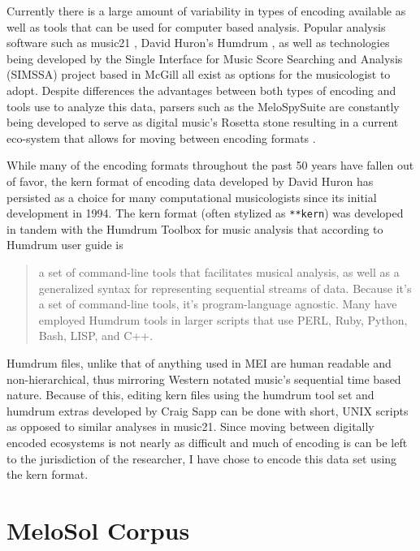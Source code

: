 \documentclass[]{book}
\begin{document}
Currently there is a large amount of variability in types of encoding available as well as tools that can be used for computer based analysis.
Popular analysis software such as music21 \citep{cuthbertMusic21ToolkitComputerAided2010}, David Huron's Humdrum \citep{huronHumdrumToolkitReference1994}, as well as technologies being developed by the Single Interface for Music Score Searching and Analysis (SIMSSA) project based in McGill all exist as options for the musicologist to adopt.
Despite differences the advantages between both types of encoding and tools use to analyze this data, parsers such as the MeloSpySuite are constantly being developed to serve as digital music's Rosetta stone resulting in a current eco-system that allows for moving between encoding formats \citep{frielerIntroducingJazzomatProject2013}.

While many of the encoding formats throughout the past 50 years have fallen out of favor, the kern format of encoding data developed by David Huron has persisted as a choice for many computational musicologists since its initial development in 1994.
The kern format (often stylized as \texttt{**kern}) was developed in tandem with the Humdrum Toolbox for music analysis that according to Humdrum user guide \citep{huronHumdrumToolkitReference1994} is

\begin{quote}
a set of command-line tools that facilitates musical analysis, as well as a generalized syntax for representing sequential streams of data. Because it's a set of command-line tools, it's program-language agnostic. Many have employed Humdrum tools in larger scripts that use PERL, Ruby, Python, Bash, LISP, and C++.
\end{quote}

Humdrum files, unlike that of anything used in MEI are human readable and non-hierarchical, thus mirroring Western notated music's sequential time based nature.
Because of this, editing kern files using the humdrum tool set and humdrum extras developed by Craig Sapp \citep{sappHumdrumExtras2008} can be done with short, UNIX scripts as opposed to similar analyses in music21.
Since moving between digitally encoded ecosystems is not nearly as difficult and much of encoding is can be left to the jurisdiction of the researcher, I have chose to encode this data set using the kern format.

\hypertarget{melosol-corpus}{%
\section{MeloSol Corpus}\label{melosol-corpus}}
\end{document}
